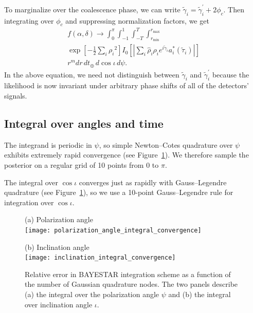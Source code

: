 \documentclass[amsmath,amssymb,aps,prx,reprint,nopreprintnumbers,nofootinbib,showpacs]{revtex4-1}
\begin{document}
To marginalize over the coalescence phase, we can write $\tilde{\gamma}_i = \tilde{\gamma}_i^\prime + 2\phi_c$. Then integrating over $\phi_c$ and suppressing normalization factors, we get
%
\begin{multline}
    f(\alpha, \delta) \rightarrow
    \int_{0}^{\pi}
    \int_{-1}^{1}
    \int_{-T}^{T}
    \int_{r_\mathrm{min}}^{r_\mathrm{max}}
    \\
    \exp \left[ - \frac{1}{2} \sum_i {\rho_i}^2 \right] I_0 \left[
            \left| \sum_i \hat\rho_i \rho_i e^{i \tilde{\gamma}_i} a_i^*(\tilde{\tau}_i)
            \right|
    \right] \\
    r^m dr \, dt_\oplus \, d\cos{\iota} \, d\psi.
\end{multline}
%
In the above equation, we need not distinguish between $\tilde{\gamma}_i$ and $\tilde{\gamma}_i^\prime$ because the likelihood is now invariant under arbitrary phase shifts of all of the detectors' signals.

\subsection{Integral over angles and time}

The integrand is periodic in $\psi$, so simple Newton\nobreakdashes--Cotes quadrature over $\psi$ exhibits extremely rapid convergence (see Figure~\ref{fig:angle-convergence}). We therefore sample the posterior on a regular grid of 10 points from 0 to $\pi$.

The integral over $\cos\iota$ converges just as rapidly with Gauss\nobreakdashes--Legendre quadrature (see Figure~\ref{fig:angle-convergence}), so we use a 10\nobreakdashes-point Gauss\nobreakdashes--Legendre rule for integration over $\cos\iota$.

\begin{figure}
    \begin{minipage}[t]{0.5\textwidth}
        \centering
        (a) Polarization angle \\
        \texttt{[image: polarization\_angle\_integral\_convergence]}
    \end{minipage}%
    \begin{minipage}[t]{0.5\textwidth}
        \centering
        (b) Inclination angle \\
        \texttt{[image: inclination\_integral\_convergence]}
    \end{minipage}
    \caption{\label{fig:angle-convergence}Relative error in \ac{BAYESTAR} integration scheme as a function of the number of Gaussian quadrature nodes. The two panels describe (a) the integral over the polarization angle $\psi$ and (b) the integral over inclination angle $\iota$.}
\end{figure}
\end{document}
